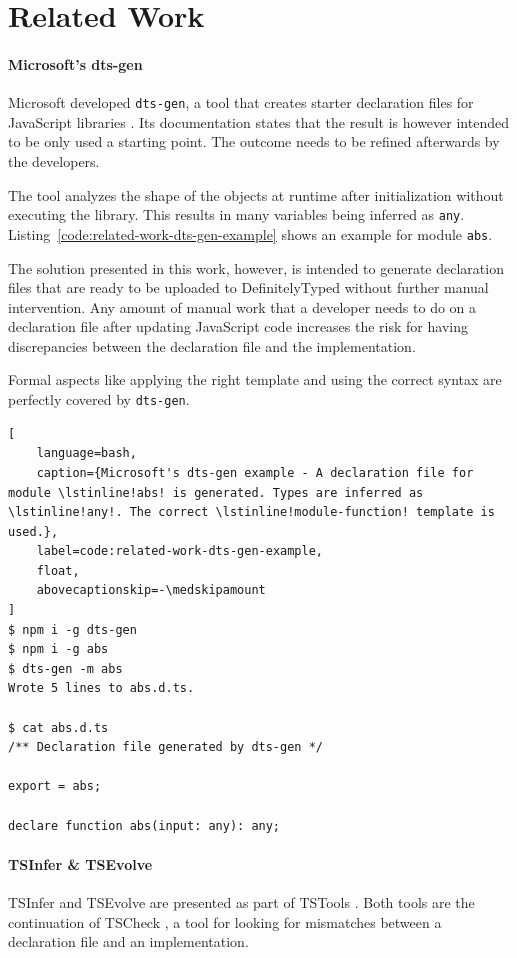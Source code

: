 \documentclass[a4paper,english,cleveref, autoref]{lipics-v2019}
\newcommand{\coderef}[1]{Listing~\ref{#1}}
\begin{document}
\section{Related Work}
\paragraph*{Microsoft's dts-gen}
Microsoft developed \lstinline[language={}]{dts-gen}, a tool that creates starter declaration files for JavaScript libraries \cite{dts-gen}. Its documentation states that the result is however intended to be only used a starting point. The outcome needs to be refined afterwards by the developers.

The tool analyzes the shape of the objects at runtime after initialization without executing the library. This results in many variables being inferred as \lstinline[language={}]{any}. \coderef{code:related-work-dts-gen-example} shows an example for module \lstinline[language={}]{abs}.

The solution presented in this work, however, is intended to generate declaration files that are ready to be uploaded to DefinitelyTyped without further manual intervention. Any amount of manual work that a developer needs to do on a declaration file after updating JavaScript code increases the risk for having discrepancies between the declaration file and the implementation.

Formal aspects like applying the right template and using the correct syntax are perfectly covered by \lstinline[language={}]{dts-gen}.

\begin{lstlisting}[
    language=bash,
    caption={Microsoft's dts-gen example - A declaration file for module \lstinline!abs! is generated. Types are inferred as \lstinline!any!. The correct \lstinline!module-function! template is used.},
	label=code:related-work-dts-gen-example,
    float,
    abovecaptionskip=-\medskipamount
]
$ npm i -g dts-gen
$ npm i -g abs
$ dts-gen -m abs
Wrote 5 lines to abs.d.ts.

$ cat abs.d.ts
/** Declaration file generated by dts-gen */

export = abs;

declare function abs(input: any): any;
\end{lstlisting}

\paragraph*{TSInfer \& TSEvolve}
TSInfer and TSEvolve are presented as part of TSTools \cite{DBLP:conf/fase/KristensenM17}. Both tools are the continuation of TSCheck \cite{DBLP:conf/oopsla/FeldthausM14}, a tool for looking for mismatches between a declaration file and an implementation.
\end{document}

